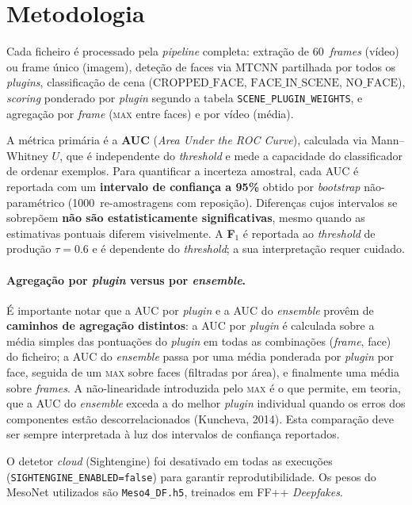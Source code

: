 \section{Metodologia}
\label{sec:bench:methodology}

Cada ficheiro é processado pela \emph{pipeline} completa: extração de
60~\emph{frames} (vídeo) ou frame único (imagem), deteção de faces via MTCNN
partilhada por todos os \emph{plugins}, classificação de cena
($\mathrm{CROPPED\_FACE}$, $\mathrm{FACE\_IN\_SCENE}$, $\mathrm{NO\_FACE}$),
\emph{scoring} ponderado por \emph{plugin} segundo a tabela \mbox{\texttt{SCENE\_PLUGIN\_WEIGHTS}},
e agregação por \emph{frame} (\textsc{max} entre faces) e por vídeo (média).

A métrica primária é a \textbf{AUC} (\emph{Area Under the ROC Curve}),
calculada via Mann--Whitney $U$, que é independente do \emph{threshold} e
mede a capacidade do classificador de ordenar exemplos. Para quantificar a
incerteza amostral, cada AUC é reportada com um \textbf{intervalo de
confiança a 95\%} obtido por \emph{bootstrap} não-paramétrico
(1000~re-amostragens com reposição). Diferenças cujos intervalos se
sobrepõem \textbf{não são estatisticamente significativas}, mesmo quando as
estimativas pontuais diferem visivelmente. A \textbf{F$_1$} é reportada ao
\emph{threshold} de produção $\tau=0.6$ e é dependente do
\emph{threshold}; a sua interpretação requer cuidado.

\paragraph{Agregação por \emph{plugin} versus por \emph{ensemble}.}
É importante notar que a AUC por \emph{plugin} e a AUC do \emph{ensemble}
provêm de \textbf{caminhos de agregação distintos}: a AUC por \emph{plugin}
é calculada sobre a média simples das pontuações do \emph{plugin} em todas
as combinações (\emph{frame}, face) do ficheiro; a AUC do \emph{ensemble}
passa por uma média ponderada por \emph{plugin} por face, seguida de um
\textsc{max} sobre faces (filtradas por área), e finalmente uma média sobre
\emph{frames}. A não-linearidade introduzida pelo \textsc{max} é o que
permite, em teoria, que a AUC do \emph{ensemble} exceda a do melhor
\emph{plugin} individual quando os erros dos componentes estão
descorrelacionados (Kuncheva, 2014). Esta comparação deve ser sempre
interpretada à luz dos intervalos de confiança reportados.

O detetor \emph{cloud} (Sightengine) foi desativado em todas as execuções
(\texttt{SIGHTENGINE\_ENABLED=false}) para garantir reprodutibilidade. Os
pesos do MesoNet utilizados são \texttt{Meso4\_DF.h5}, treinados em FF++
\emph{Deepfakes}.

